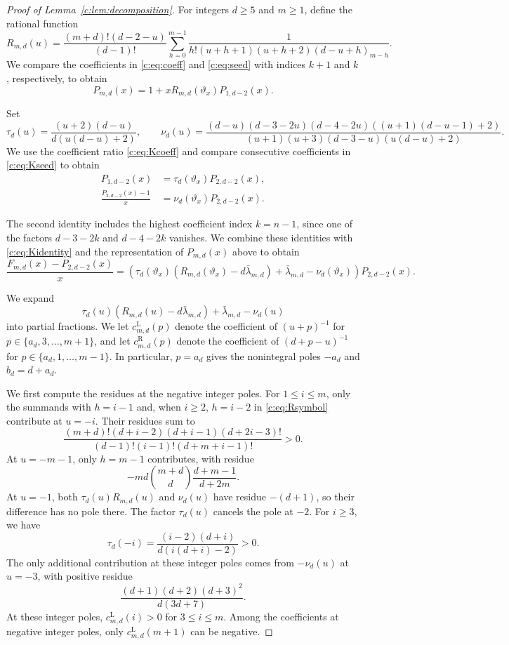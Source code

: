 \documentclass[10pt,a4paper]{article}
\numberwithin{equation}{section}
\theoremstyle{remark}\newtheorem{remark}[theorem]{Remark}
\newcommand{\varthetax}{\vartheta_x}
\begin{document}
\begin{proof}[Proof of Lemma~\ref{c:lem:decomposition}]
For integers $d\ge5$ and $m\ge1$, define the rational function
\begin{equation}\label{c:eq:Rsymbol}
 R_{m,d}(u)=\frac{(m+d)!(d-2-u)}{(d-1)!}\sum_{h=0}^{m-1}
 \frac1{h!(u+h+1)(u+h+2)(d-u+h)_{m-h}}.
\end{equation}
We compare the coefficients in \eqref{c:eq:coeff} and \eqref{c:eq:seed}
with indices $k+1$ and $k$, respectively, to obtain
\[
 P_{m,d}(x)=1+xR_{m,d}(\varthetax)P_{1,d-2}(x).
\]

Set
\begin{equation*}
 \tau_d(u)=\frac{(u+2)(d-u)}{d(u(d-u)+2)},\qquad
 \nu_d(u)=\frac{(d-u)(d-3-2u)(d-4-2u)
 ((u+1)(d-u-1)+2)}
 {(u+1)(u+3)(d-3-u)(u(d-u)+2)}.
\end{equation*}
We use the coefficient ratio \eqref{c:eq:Kcoeff} and compare consecutive
coefficients in \eqref{c:eq:Kseed} to obtain
\[
 \begin{aligned}
 P_{1,d-2}(x)&=\tau_d(\varthetax)P_{2,d-2}(x),\\
 \frac{P_{2,d-2}(x)-1}x&=\nu_d(\varthetax)P_{2,d-2}(x).
 \end{aligned}
\]

The second identity includes the highest coefficient index $k=n-1$,
since one of the factors $d-3-2k$ and $d-4-2k$ vanishes.
We combine these identities with \eqref{c:eq:Kidentity} and
the representation of $P_{m,d}(x)$ above to obtain
\begin{equation}\label{c:eq:symbolmain}
 \frac{F_{m,d}(x)-P_{2,d-2}(x)}{x}=\left(\tau_d(\varthetax)(R_{m,d}(\varthetax)-d\bar\lambda_{m,d})+\bar\lambda_{m,d}-\nu_d(\varthetax)\right)P_{2,d-2}(x).
\end{equation}

We expand
\[
 \tau_d(u)(R_{m,d}(u)-d\bar\lambda_{m,d})
 +\bar\lambda_{m,d}-\nu_d(u)
\]
into partial fractions. We let $c_{m,d}^{\mathrm L}(p)$ denote the coefficient of $(u+p)^{-1}$
for $p\in\{a_d,3,\ldots,m+1\}$, and let $c_{m,d}^{\mathrm R}(p)$
denote the coefficient of $(d+p-u)^{-1}$
for $p\in\{a_d,1,\ldots,m-1\}$.
In particular, $p=a_d$ gives
the nonintegral poles $-a_d$ and $b_d=d+a_d$.

We first compute the residues at the negative integer poles.
For $1\le i\le m$, only the summands with $h=i-1$ and, when $i\ge2$,
$h=i-2$ in
\eqref{c:eq:Rsymbol} contribute at $u=-i$. Their residues sum to
\[
 \frac{(m+d)!(d+i-2)(d+i-1)(d+2i-3)!}
 {(d-1)!(i-1)!(d+m+i-1)!}>0.
\]
At $u=-m-1$, only $h=m-1$ contributes, with residue
\[
 -md\binom{m+d}{d}\frac{d+m-1}{d+2m}.
\]
At $u=-1$, both $\tau_d(u)R_{m,d}(u)$ and $\nu_d(u)$ have
residue $-(d+1)$, so their difference has no pole there.
The factor $\tau_d(u)$ cancels the pole at $-2$. For $i\ge3$, we have
\[
 \tau_d(-i)=\frac{(i-2)(d+i)}{d(i(d+i)-2)}>0.
\]
The only additional contribution at these integer poles comes from
$-\nu_d(u)$ at $u=-3$, with positive residue
\[
 \frac{(d+1)(d+2)(d+3)^2}{d(3d+7)}.
\]
At these integer poles, $c_{m,d}^{\mathrm L}(i)>0$ for $3\le i\le m$.
Among the coefficients at negative integer poles, only
$c_{m,d}^{\mathrm L}(m+1)$ can be negative.


\end{proof}
\end{document}
